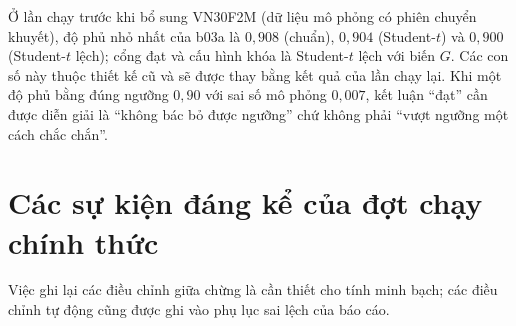 \documentclass[12pt,a4paper]{article}
\theoremstyle{remark}
\begin{document}
Ở lần chạy trước khi bổ sung VN30F2M (dữ liệu mô phỏng có phiên chuyển khuyết), độ phủ nhỏ nhất của b03a là $0{,}908$ (chuẩn), $0{,}904$ (Student-$t$) và $0{,}900$ (Student-$t$ lệch); cổng đạt và cấu hình khóa là Student-$t$ lệch với biến $G$. Các con số này thuộc thiết kế cũ và sẽ được thay bằng kết quả của lần chạy lại. Khi một độ phủ bằng đúng ngưỡng $0{,}90$ với sai số mô phỏng $0{,}007$, kết luận ``đạt'' cần được diễn giải là ``không bác bỏ được ngưỡng'' chứ không phải ``vượt ngưỡng một cách chắc chắn''.

\section{Các sự kiện đáng kể của đợt chạy chính thức}\label{sec:suKien}

Việc ghi lại các điều chỉnh giữa chừng là cần thiết cho tính minh bạch; các điều chỉnh tự động cũng được ghi vào phụ lục sai lệch của báo cáo.
\end{document}
